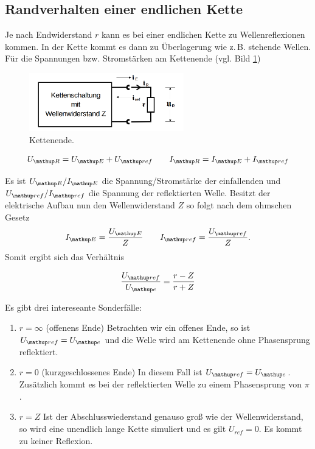 \subsection{Randverhalten einer endlichen Kette}
Je nach Endwiderstand $r$ kann es bei einer endlichen Kette
zu Wellenreflexionen kommen. In der Kette kommt es dann %
zu Überlagerung wie z.\,B. stehende Wellen. %
Für die Spannungen bzw. Stromstärken am Kettenende (vgl. Bild \ref{fig:kettenende}) %

\begin{figure}
  \centering
  \includegraphics[width=0.6\textwidth]{bilder/wellenwiderstand.png}
  \caption{Kettenende.\cite{anleitung356}}
  \label{fig:kettenende}
\end{figure}

\begin{equation*}
U\ua{R}=U\ua{E}+U\ua{ref} \qquad I\ua{R}=I\ua{E}+I\ua{ref}
\end{equation*}

Es ist $U\ua{E}/I\ua{E}$ die Spannung/Stromstärke der einfallenden und $U\ua{ref}/I\ua{ref}$ die Spannung der reflektierten
Welle. Besitzt der elektrische Aufbau nun den Wellenwiderstand $Z$ so folgt nach dem
ohmschen Gesetz
\begin{equation*}
I\ua{E}=\frac{U\ua{E}}{Z} \qquad I\ua{ref}=\frac{U\ua{ref}}{Z}.
\end{equation*}
Somit ergibt sich das Verhältnis

\begin{equation*}
\frac{U\ua{ref}}{U\ua{e}}=\frac{r-Z}{r+Z}
\end{equation*}

Es gibt drei intereseante Sonderfälle:

\renewcommand{\labelenumi}{\alph{enumi})}
\begin{enumerate}
\item{ $r=\infty$ (offenens Ende) \newline
Betrachten wir ein offenes Ende, so ist $U\ua{ref}=U\ua{e}$ und die Welle wird am Kettenende ohne Phasensprung reflektiert.} %
\item{ $r=0$ (kurzgeschlossenes Ende) \newline
In diesem Fall ist $U\ua{ref}=U\ua{e}$. Zusätzlich kommt es bei der reflektierten Welle zu einem Phasensprung von $\pi$.} %
\item{ $r=Z$ \newline
Ist der Abschlusswiederstand genauso groß wie der Wellenwiderstand, so wird eine unendlich lange Kette simuliert und
es gilt $U_{ref}=0$. Es kommt zu keiner Reflexion.}
\end{enumerate}

